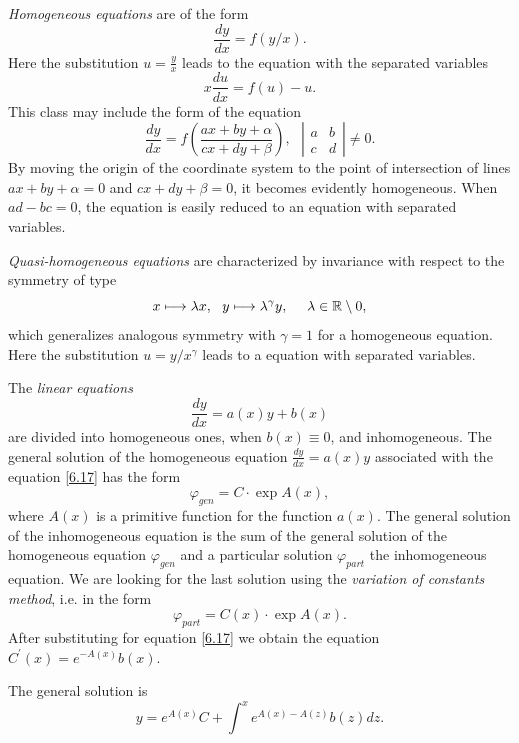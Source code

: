 \begin{example}
	\emph{Homogeneous equations} are of the form
	$$
	\frac{dy}{dx}=f\left( y/x\right).
	$$
	Here the substitution $u=\frac{y}{x}$ leads to the equation with the separated variables
	$$
	x\frac{du}{dx}=f(u)-u.
	$$
	This class may include the form of the equation
	$$
	\frac{dy}{dx}=f\left( \frac{ax+by+\alpha }{cx+dy+\beta }\right) ,\text{ \ \ }%
	\left\vert
	\begin{array}{cc}
	a & b \\
	c & d%
	\end{array}%
	\right\vert \not=0.
	$$
	By moving the origin of the coordinate system to the point of intersection of lines $ax+by+\alpha =0$ and $cx+dy+\beta =0$, it becomes evidently homogeneous. When $ad-bc=0$, the equation is easily reduced to an equation with separated variables.
\end{example}

\begin{example}
	\emph{Quasi-homogeneous equations} are characterized by invariance with respect to the symmetry of type
	$$
	x\longmapsto \lambda x,\text{ \ }y\longmapsto \lambda ^{\gamma }y,\text{ \ \
		\ }\lambda \in \mathbb{R}\setminus 0,
	$$
	which generalizes analogous symmetry with $\gamma =1$ for a homogeneous equation. Here the substitution $u=y/x^{\gamma }$ leads to a equation with separated variables.
\end{example}

\begin{example}
	The \emph{linear equations}
	\begin{equation}
	\label{6.17}
	\frac{dy}{dx}=a(x)y+b(x)
	\end{equation}
	are divided into homogeneous ones, when $b(x)\equiv 0$, and inhomogeneous. The general solution of the homogeneous equation $\frac{dy}{dx}=a(x)y$ associated with the equation \eqref{6.17} has the form
	$$
	\varphi _{gen}=C\cdot \exp A(x),
	$$
	where $A (x)$ is a primitive function for the function $a (x)$. The general solution of the inhomogeneous equation is the sum of the general solution of the homogeneous equation $\varphi _{gen}$ and a particular solution $\varphi _{part}$ the inhomogeneous equation. We are looking for the last solution using the \emph{variation of constants method}, i.e. in the form
	$$
	\varphi _{part}=C(x)\cdot \exp A(x).
	$$
	After substituting for equation \eqref{6.17} we obtain the equation
	$C^{\prime
	}(x)=e^{-A(x)}b(x)$.
	
	The general solution is
	\begin{equation}
	\label{6.18}
	y=e^{A(x)}C+\int^{x}e^{A(x)-A(z)}b(z)dz.
	\end{equation}
\end{example}

